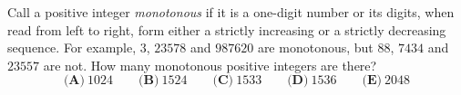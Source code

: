 Call a positive integer \emph{monotonous} if it is a one-digit number or its digits, when read from left to right, form either a strictly increasing or a strictly decreasing sequence. For example, $3$, $23578$ and $987620$ are monotonous, but $88$, $7434$ and $23557$ are not. How many monotonous positive integers are there?
\[\textbf{(A)}\ 1024\qquad\textbf{(B)}\ 1524\qquad\textbf{(C)}\ 1533\qquad\textbf{(D)}\ 1536\qquad\textbf{(E)}\ 2048\]
